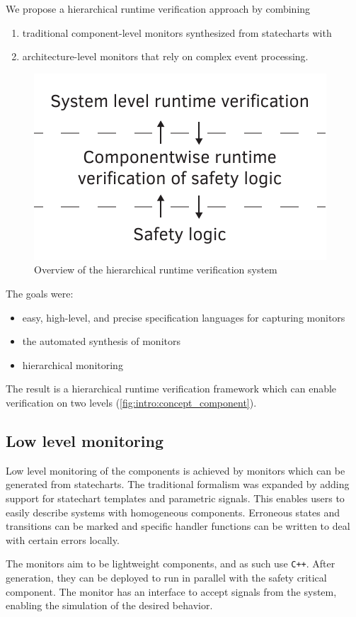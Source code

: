We propose a hierarchical runtime verification approach by combining
\begin{enumerate}
\item traditional component-level monitors synthesized from statecharts with 
\item architecture-level monitors that rely on complex event processing.
\end{enumerate}

\begin{figure}[h]
	\centering
	\includegraphics[width=0.4\linewidth]{include/figures/chapter_6/overview_1}
	\caption{Overview of the hierarchical runtime verification system}
	\label{fig:case_study:fov}
\end{figure}

The goals were:
\begin{itemize}
\item easy, high-level, and precise specification languages for capturing monitors
\item the automated synthesis of monitors
\item hierarchical monitoring
\end {itemize}

The result is a hierarchical runtime verification framework which can enable verification on two levels (\cref{fig:intro:concept_component}).

\subsection{Low level monitoring}
Low level monitoring of the components is achieved by monitors which can be generated from statecharts. The traditional formalism was expanded by adding support for statechart templates and parametric signals. This enables users to easily describe systems with homogeneous components. Erroneous states and transitions can be marked and specific handler functions can be written to deal with certain errors locally.

The monitors aim to be lightweight components, and as such use \verb!C++!. After generation, they can be deployed to run in parallel with the safety critical component. The monitor has an interface to accept signals from the system, enabling the simulation of the desired behavior.

